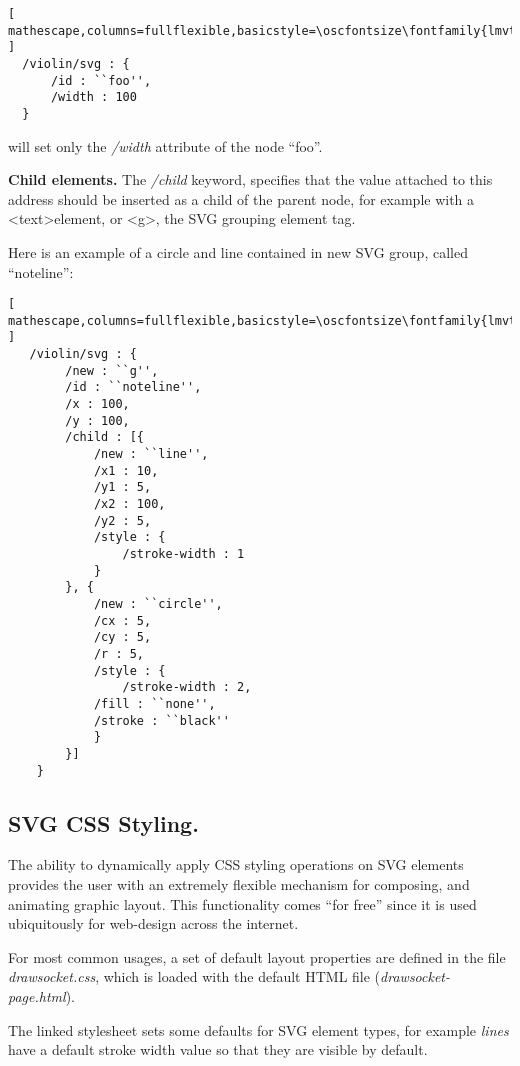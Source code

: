 \begin{lstlisting}[ mathescape,columns=fullflexible,basicstyle=\oscfontsize\fontfamily{lmvtt}\selectfont ]
  /violin/svg : {
      /id : ``foo'',
      /width : 100
  }
  \end{lstlisting}

\noindent
will set only the \textit{/width} attribute of the node ``foo''.

\medskip
\noindent
\textbf{Child elements.} 
The \textit{/child} keyword, specifies that the value attached to this address should be inserted as a child of the parent node, for example with a \textless text\textgreater element, or \textless g\textgreater, the SVG grouping element tag.

Here is an example of a circle and line contained in new SVG group, called ``noteline'':

\begin{lstlisting}[ mathescape,columns=fullflexible,basicstyle=\oscfontsize\fontfamily{lmvtt}\selectfont ]
   /violin/svg : {
        /new : ``g'',
        /id : ``noteline'',
        /x : 100,
        /y : 100,
    	/child : [{
      	    /new : ``line'',
      	    /x1 : 10,
      	    /y1 : 5,
      	    /x2 : 100,
      	    /y2 : 5,
      	    /style : {
      	        /stroke-width : 1
      	    }
      	}, {
      	    /new : ``circle'',
      	    /cx : 5,
      	    /cy : 5,
      	    /r : 5,
      	    /style : {
      	        /stroke-width : 2,
      		/fill : ``none'',
      		/stroke : ``black''
      	    }
        }]
    }
\end{lstlisting}


\subsection{SVG CSS Styling.} 
The ability to dynamically apply CSS styling operations on SVG elements provides the user with an extremely flexible mechanism for composing, and animating graphic layout.
This functionality comes ``for free'' since it is used ubiquitously for web-design across the internet.

For most common \drawsocket usages, a set of default layout properties are defined in the file \textit{drawsocket.css}, which is loaded with the default HTML file (\textit{drawsocket-page.html}).

The linked stylesheet sets some defaults for SVG element types, for example \textit{lines} have a default stroke width value so that they are visible by default.

